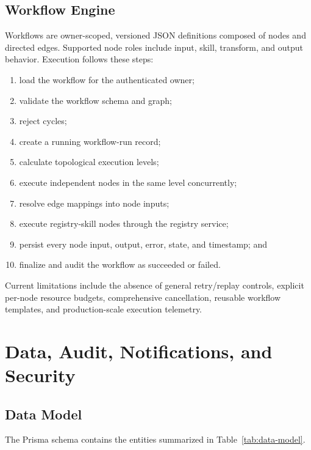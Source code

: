 \documentclass[12pt]{report}
\begin{document}
\section{Workflow Engine}

Workflows are owner-scoped, versioned JSON definitions composed of nodes and directed edges. Supported node roles include input, skill, transform, and output behavior. Execution follows these steps:

\begin{enumerate}
  \item load the workflow for the authenticated owner;
  \item validate the workflow schema and graph;
  \item reject cycles;
  \item create a running workflow-run record;
  \item calculate topological execution levels;
  \item execute independent nodes in the same level concurrently;
  \item resolve edge mappings into node inputs;
  \item execute registry-skill nodes through the registry service;
  \item persist every node input, output, error, state, and timestamp; and
  \item finalize and audit the workflow as succeeded or failed.
\end{enumerate}

Current limitations include the absence of general retry/replay controls, explicit per-node resource budgets, comprehensive cancellation, reusable workflow templates, and production-scale execution telemetry.

\chapter{Data, Audit, Notifications, and Security}

\section{Data Model}

The Prisma schema contains the entities summarized in Table~\ref{tab:data-model}.
\end{document}
